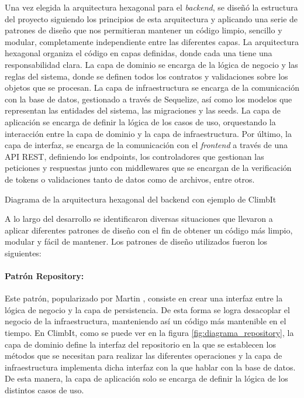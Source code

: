 Una vez elegida la arquitectura hexagonal para el \textit{backend}, se diseñó la estructura del proyecto siguiendo los principios de esta arquitectura y aplicando una serie de patrones de diseño que nos permitieran mantener un código limpio, sencillo y modular, completamente independiente entre las diferentes capas. La arquitectura hexagonal organiza el código en capas definidas, donde cada una tiene una responsabilidad clara. La capa de dominio se encarga de la lógica de negocio y las reglas del sistema, donde se definen todos los contratos y validaciones sobre los objetos que se procesan. La capa de infraestructura se encarga de la comunicación con la base de datos, gestionado a través de Sequelize, así como los modelos que representan las entidades del sistema, las migraciones y las seeds. La capa de aplicación se encarga de definir la lógica de los casos de uso, orquestando la interacción entre la capa de dominio y la capa de infraestructura. Por último, la capa de interfaz, se encarga de la comunicación con el \textit{frontend} a través de una API REST, definiendo los endpoints, los controladores que gestionan las peticiones y respuestas junto con middlewares que se encargan de la verificación de tokens o validaciones tanto de datos como de archivos, entre otros.

{Diagrama de la arquitectura hexagonal del backend con ejemplo de ClimbIt}

A lo largo del desarrollo se identificaron diversas situaciones que llevaron a aplicar diferentes patrones de diseño con el fin de obtener un código más limpio, modular y fácil de mantener. Los patrones de diseño utilizados fueron los siguientes:

\paragraph{Patrón Repository:} Este patrón, popularizado por Martin \cite{fowler2002patterns}, consiste en crear una interfaz entre la lógica de negocio y la capa de persistencia. De esta forma se logra desacoplar el negocio de la infraestructura, manteniendo así un código más mantenible en el tiempo. En ClimbIt, como se puede ver en la figura \ref{fig:diagrama_repository}, la capa de dominio define la interfaz del repositorio en la que se establecen los métodos que se necesitan para realizar las diferentes operaciones y la capa de infraestructura implementa dicha interfaz con la que hablar con la base de datos. De esta manera, la capa de aplicación solo se encarga de definir la lógica de los distintos casos de uso.

